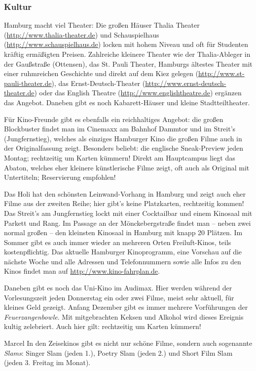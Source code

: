 \subsubsection{Kultur}

Hamburg macht viel Theater: Die großen Häuser Thalia Theater
(\url{http://www.thalia-theater.de}) und Schauspielhaus
(\url{http://www.schauspielhaus.de}) locken mit hohem Niveau und oft für
Studenten kräftig ermäßigten Preisen. Zahlreiche kleinere Theater wie der
Thalia-Ableger in der Gaußstraße (Ottensen), das St.  Pauli Theater, Hamburgs
ältestes Theater mit einer ruhmreichen Geschichte und direkt auf dem Kiez
gelegen (\url{http://www.st-pauli-theater.de}), das Ernst-Deutsch-Theater
(\url{http://www.ernst-deutsch-theater.de}) oder das English Theatre
(\url{http://www.englishtheatre.de}) ergänzen das Angebot. Daneben gibt es noch
Kabarett-Häuser und kleine Stadtteiltheater.

Für Kino-Freunde gibt es ebenfalls ein reichhaltiges Angebot: die großen
Blockbuster findet man im Cinemaxx am Bahnhof Dammtor und im Streit's
(Jungfernstieg), welches als einziges Hamburger Kino die großen Filme auch in
der Originalfassung zeigt. Besonders beliebt: die englische Sneak-Preview jeden
Montag; rechtzeitig um Karten kümmern! Direkt am Hauptcampus liegt das Abaton,
welches eher kleinere künstlerische Filme zeigt, oft auch als Original mit
Untertiteln; Reservierung empfohlen!

Das Holi hat den schönsten Leinwand-Vorhang in Hamburg und zeigt auch eher
Filme aus der zweiten Reihe; hier gibt's keine Platzkarten, rechtzeitig kommen!
Das Streit's am Jungfernstieg lockt mit einer Cocktailbar und einem Kinosaal
mit Parkett und Rang. Im Passage an der Mönckebergstraße findet man -- neben
zwei normal großen -- den kleinsten Kinosaal in Hamburg mit knapp 20 Plätzen.
Im Sommer gibt es auch immer wieder an mehreren Orten Freiluft-Kinos, teils
kostenpflichtig. Das aktuelle Hamburger Kinoprogramm, eine Vorschau auf die
nächste Woche und alle Adressen und Telefonnummern sowie alle Infos zu den Kinos
findet man auf \url{http://www.kino-fahrplan.de}.

Daneben gibt es noch das Uni-Kino im Audimax. Hier werden während der
Vorlesungszeit jeden Donnerstag ein oder zwei Filme, meist sehr aktuell, für
kleines Geld gezeigt. Anfang Dezember gibt es immer mehrere Vorführungen der
\emph{Feuerzangenbowle}. Mit mitgebrachten Keksen und Alkohol wird dieses
Ereignis kultig zelebriert. Auch hier gilt: rechtzeitig um Karten kümmern!

\begin{advice}{Marcel}
In den Zeisekinos gibt es nicht nur schöne Filme, sondern auch sogenannte
\emph{Slams}: Singer Slam (jeden 1.), Poetry Slam (jeden 2.) und Short Film
Slam (jeden 3. Freitag im Monat).
\end{advice}
